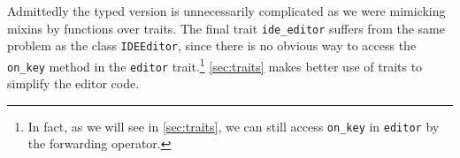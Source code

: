 Admittedly the typed version is unnecessarily complicated as we were
mimicking mixins by functions over traits. The final trait
\lstinline{ide_editor} suffers from the same problem as the class
\lstinline{IDEEditor}, since there is no obvious way to access the
\lstinline{on_key} method in the \lstinline{editor} trait.\footnote{In fact, as
  we will see in \cref{sec:traits}, we can still access \lstinline{on_key} in
  \lstinline{editor} by the forwarding operator.} \cref{sec:traits}
makes better use of traits to simplify the editor code.




